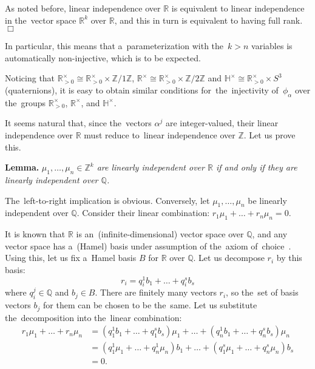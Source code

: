 \documentclass[twoside]{article}
\begin{document}
    As noted before, linear independence over $\mathbb{R}$ is equivalent to linear independence
    in the~vector space $\mathbb{R}^k$ over $\mathbb{R}$, and this in turn is equivalent to having full rank.
\hfill$\Box$\medskip

In particular, this means that a~parameterization with the~$k > n$ variables is automatically
non-injective, which is to be expected.

Noticing that $\mathbb{R}_{>0}^\times \cong \mathbb{R}_{>0}^\times \times \mathbb{Z} / 1\mathbb{Z}$, $\mathbb{R}^\times \cong \mathbb{R}_{>0}^\times \times \mathbb{Z} / 2 \mathbb{Z}$
and $\mathbb{H}^\times \cong \mathbb{R}_{>0}^\times \times S^3$ (quaternions), it is easy to obtain similar conditions for~the~injectivity of~$\phi_\alpha$ over the~groups
$\mathbb{R}_{>0}^\times$, $\mathbb{R}^\times$, and $\mathbb{H}^\times$.

It seems natural that, since the~vectors $\alpha^j$ are integer-valued, their linear independence over $\mathbb{R}$
must reduce to~linear independence over $\mathbb{Z}$. Let us prove this.

\medskip\noindent\textbf{Lemma.}\emph{
    $\mu_1, \ldots, \mu_n \in \mathbb{Z}^k$ are linearly independent over $\mathbb{R}$ if and only if they are linearly independent over $\mathbb{Q}$.
}\medskip

    The~left-to-right implication is obvious. Conversely, let $\mu_1, \ldots, \mu_n$ be linearly independent over $\mathbb{Q}$.
    Consider their linear combination: $r_1 \mu_1 + \ldots + r_n \mu_n = 0$.

    It is known that $\mathbb{R}$ is an~(infinite-dimensional) vector space over $\mathbb{Q}$, and any vector space has
    a~(Hamel) basis under assumption of the~axiom of~choice~\cite{Brbk70}. Using this, let us fix a~Hamel basis $B$ for $\mathbb{R}$
    over $\mathbb{Q}$. Let us decompose $r_i$ by this basis:
    $$
        r_i = q_i^1 b_1 + \ldots + q_i^s b_s
    $$
    where $q_i^j \in \mathbb{Q}$ and $b_j \in B$. There are finitely many vectors $r_i$,
    so the~set of basis vectors $b_j$ for them can be chosen to be the~same.
    Let us substitute the~decomposition into the~linear combination:
    \begin{align*}
        r_1 \mu_1 + \ldots + r_n \mu_n & = (q_1^1 b_1 + \ldots + q_1^s b_s) \mu_1 + \ldots + (q_n^1 b_1 + \ldots + q_n^s b_s) \mu_n \\
                                       & = (q_1^1 \mu_1 + \ldots + q_n^1 \mu_n) b_1 + \ldots + (q_1^s \mu_1 + \ldots + q_n^s \mu_n) b_s \\
                                       & = 0.
    \end{align*}
\end{document}

